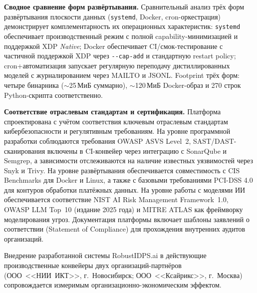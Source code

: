 \noindent\textbf{Сводное сравнение форм развёртывания.} Сравнительный
анализ трёх форм развёртывания плоскости данных (\texttt{systemd},
Docker, cron-оркестрация) демонстрирует комплементарность их
операционных характеристик: \texttt{systemd} обеспечивает
производственный режим с полной capability-минимизацией и поддержкой
XDP \emph{Native}; Docker обеспечивает CI/смок-тестирование с
частичной поддержкой XDP через \texttt{-{}-cap-add} и стандартную
restart policy; cron+автоматизация запускает регулярную переподачу
дистиллированных моделей с журналированием через MAILTO и JSONL.
Footprint трёх форм: четыре бинарника ($\sim$25\,МиБ суммарно),
$\sim$120\,МиБ Docker-образ и 270 строк Python-скрипта соответственно.

\noindent\textbf{Соответствие отраслевым стандартам и сертификация.}
Платформа спроектирована с учётом соответствия ключевым отраслевым
стандартам кибербезопасности и регулятивным требованиям. На уровне
программной разработки соблюдаются требования OWASP ASVS Level~2,
SAST/DAST-сканирования включены в CI-конвейер через интеграцию с
SonarQube и Semgrep, а зависимости отслеживаются на наличие
известных уязвимостей через Snyk и Trivy. На уровне развёртывания
обеспечивается совместимость с CIS Benchmarks для Docker и Linux,
а также с базовыми требованиями PCI-DSS 4.0 для контуров обработки
платёжных данных. На уровне работы с моделями ИИ обеспечивается
соответствие NIST AI Risk Management Framework~1.0, OWASP LLM
Top~10 (издание 2025 года) и MITRE ATLAS как фреймворку моделирования
угроз. Документация платформы включает шаблоны заявлений о
соответствии (Statement of Compliance) для прохождения внутренних
аудитов организаций.

\label{sec:economic_effect}

Внедрение разработанной системы RobustIDPS.ai в действующие
производственные конвейеры двух организаций-партнёров (ООО~<<НИИ~ИКТ>>,
г.~Новосибирск; ООО~<<Ксайрикс>>, г.~Москва) сопровождается измеримым
организационно-экономическим эффектом.

